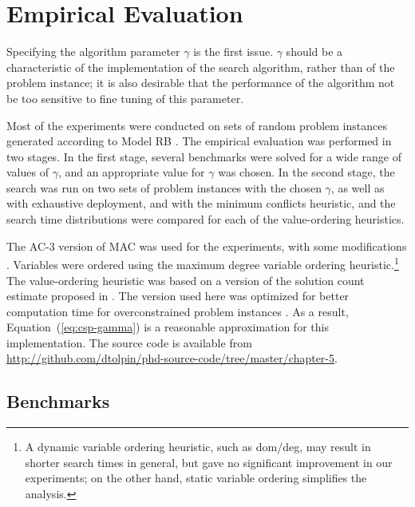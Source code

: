 \section{Empirical Evaluation}
\label{sec:csp-empirical}

Specifying the algorithm parameter $\gamma$ is the first issue.
$\gamma$ should be a characteristic of the
implementation of the search algorithm, rather than of the problem
instance; it is also desirable that the performance of the algorithm not
be too sensitive to fine tuning of this parameter.


Most of the  experiments were conducted on sets of random problem instances
generated according to Model RB \cite{Xu.rb}. The empirical evaluation
was performed in two stages. In the first stage, several benchmarks
were solved for a wide range of values of $\gamma$, and an appropriate
value for $\gamma$ was chosen. In the second stage, the search was run
on two sets of problem instances with the chosen $\gamma$, as well as
with exhaustive deployment, and with the minimum conflicts
heuristic, and the search time distributions were compared for each of
the value-ordering heuristics.

The AC-3 version of MAC was used for the experiments, with some
modifications \cite{Sabin.mac}. Variables were ordered using the
maximum degree variable ordering heuristic.\footnote{A dynamic
  variable ordering heuristic, such as dom/deg, may result in shorter
  search times in general, but gave no significant improvement  in our
  experiments; on the other hand, static variable ordering simplifies
  the analysis.} The value-ordering heuristic was based on a version
of the solution count estimate proposed in \cite{Meisels.solcount}.
The version used here was optimized for better computation time for
overconstrained problem instances . As a result,
Equation~(\ref{eq:csp-gamma}) is a reasonable approximation for this 
implementation. The source code is available from
\url{http://github.com/dtolpin/phd-source-code/tree/master/chapter-5}.

\subsection{Benchmarks}

